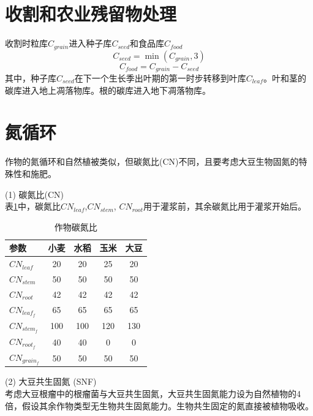 \section{收割和农业残留物处理}
收割时粒库$C_{grain}$进入种子库$C_{seed}$和食品库$C_{food}$
\begin{equation}
{C}_{ {seed }}=\min \left({C}_{ {grain }}, 3\right)
\end{equation}
\begin{equation}
{C}_{ {food }}={C}_{ {grain }}-{C}_{ {seed }}
\end{equation}
其中，种子库$C_{seed}$在下一个生长季出叶期的第一时步转移到叶库$C_{leaf}$。叶和茎的碳库进入地上凋落物库。根的碳库进入地下凋落物库。


\section{氮循环}
作物的氮循环和自然植被类似，但碳氮比(CN)不同，且要考虑大豆生物固氮的特殊性和施肥。

(1) 碳氮比(CN)\\
表\ref{tab:作物碳氮比}中，碳氮比$CN_{leaf}$,$ CN_{stem}$, $CN_{root}$用于灌浆前，其余碳氮比用于灌浆开始后。\\
\begin{table}[]
  \centering
  \caption{作物碳氮比}
  \label{tab:作物碳氮比}
\begin{tabular}{@{}lcccc@{}}
\toprule
参数         & 小麦  & 水稻  & 玉米  & 大豆  \\ \midrule
$CN_{leaf}$     & 20  & 20  & 25  & 20  \\
$CN_{stem}$     & 50  & 50  & 50  & 50  \\
$CN_{root}$     & 42  & 42  & 42  & 42  \\
$CN_{leaf_f}$  & 65  & 65  & 65  & 65  \\
$CN_{stem_f}$  & 100 & 100 & 120 & 130 \\
$CN_{root_f}$  & 40  & 40  & 0   & 0   \\
$CN_{grain_f}$ & 50  & 50  & 50  & 50  \\ \bottomrule
\end{tabular}
\end{table}

(2) 大豆共生固氮 (SNF)\\
考虑大豆根瘤中的根瘤菌与大豆共生固氮，大豆共生固氮能力设为自然植物的4倍，假设其余作物类型无生物共生固氮能力。生物共生固定的氮直接被植物吸收。\\

